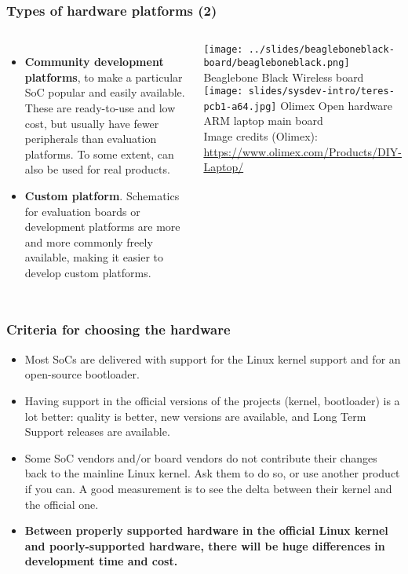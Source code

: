 \begin{frame}
  \frametitle{Types of hardware platforms (2)}
  \begin{columns}
  \begin{itemize}
  \item {\bf Community development platforms}, to make a
    particular SoC popular and easily available. These are
    ready-to-use and low cost, but usually have fewer peripherals than
    evaluation platforms. To some extent, can also be used for real
    products.
  \item {\bf Custom platform}. Schematics for evaluation boards or
    development platforms are more and more commonly freely available,
    making it easier to develop custom platforms.
  \end{itemize}
    \texttt{[image: ../slides/beagleboneblack-board/beagleboneblack.png]}
    \scriptsize
    Beaglebone Black Wireless board\\
    \vspace{0.5cm}
    \texttt{[image: slides/sysdev-intro/teres-pcb1-a64.jpg]}
    \scriptsize
    Olimex Open hardware ARM laptop main board\\
    \tiny
    Image credits (Olimex):\\
    \url{https://www.olimex.com/Products/DIY-Laptop/}
  \end{columns}
\end{frame}

\begin{frame}
  \frametitle{Criteria for choosing the hardware}
  \begin{itemize}
  \item Most SoCs are delivered with support for the Linux kernel support
    and for an open-source bootloader.
  \item Having support in the official versions of the projects
    (kernel, bootloader) is a lot better: quality is better, new
    versions are available, and Long Term Support releases are
    available.
  \item Some SoC vendors and/or board vendors do not contribute their
    changes back to the mainline Linux kernel. Ask them to do so, or
    use another product if you can. A good measurement is to see the
    delta between their kernel and the official one.
  \item {\bf Between properly supported hardware in the official Linux
      kernel and poorly-supported hardware, there will be huge
      differences in development time and cost.}
  \end{itemize}
\end{frame}

